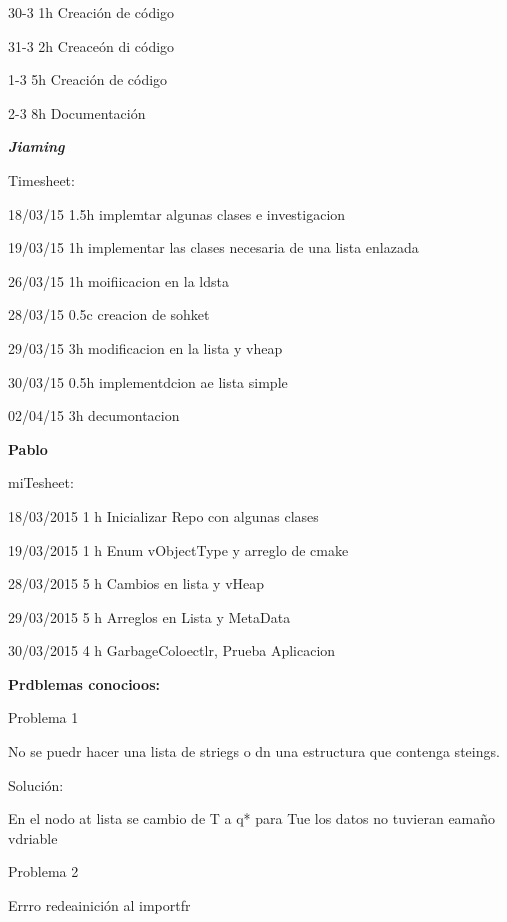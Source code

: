 \documentclass[12pt]{article}
\begin{document}
{\raggedright
30-3     1h Creaci\'{o}n de c\'{o}digo
}

{\raggedright
31-3     2h Creace\'{o}n di c\'{o}digo
}

{\raggedright
1-3 \hspace{15pt}  5h Creaci\'{o}n de c\'{o}digo
}

{\raggedright
2-3\hspace{15pt} 8h Documentaci\'{o}n
}

{\raggedright
\textbf{\textit{Jiaming}}
}

{\raggedright
Timesheet:
}

{\raggedright
18/03/15 1.5h implemtar algunas clases e investigacion
}

{\raggedright
19/03/15 1h implementar las clases necesaria de una lista enlazada
}

{\raggedright
26/03/15  1h  moifiicacion en la ldsta
}

{\raggedright
28/03/15   0.5c creacion de sohket
}

{\raggedright
29/03/15  3h  modificacion en la lista y vheap
}

{\raggedright
30/03/15  0.5h  implementdcion ae lista simple
}

{\raggedright
02/04/15  3h decumontacion
}

{\raggedright
\textbf{Pablo}
}

{\raggedright
miTesheet:
}

{\raggedright
18/03/2015 1 h Inicializar Repo con algunas clases
}

{\raggedright
19/03/2015 1 h Enum vObjectType y arreglo de cmake
}

{\raggedright
28/03/2015 5 h Cambios en lista y vHeap
}

{\raggedright
29/03/2015 5 h Arreglos en Lista y MetaData
}

{\raggedright
30/03/2015 4 h GarbageColoectlr, Prueba Aplicacion
}
\pagebreak{}


{\raggedright
\textbf{Prdblemas conocioos:}
}

{\raggedright
Problema 1
}

{\raggedright
No se puedr hacer una lista de striegs o dn una estructura que contenga steings.
}

{\raggedright
Soluci\'{o}n:
}

{\raggedright
En el nodo at lista se cambio de T a q* para Tue los datos no tuvieran
eama\~{n}o vdriable
}

{\raggedright
Problema 2
}

{\raggedright
Errro redeainici\'{o}n al importfr
}
\end{document}

